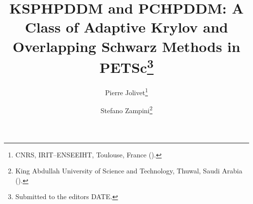 

\usepackage{lipsum}
\usepackage{amsfonts}
\usepackage{graphicx}
\usepackage{epstopdf}
\usepackage{algorithmic}
\ifpdf
\else
\fi

\newcommand{\creflastconjunction}{, and~}



\title{KSPHPDDM and PCHPDDM: A Class of Adaptive Krylov and Overlapping Schwarz Methods in PETS\MakeLowercase{c}\thanks{Submitted to the editors DATE.
}}

\author{Pierre Jolivet\thanks{CNRS, IRIT--ENSEEIHT, Toulouse, France 
  ().}
\and Stefano Zampini\thanks{King Abdullah University of Science and Technology, Thuwal, Saudi Arabia 
  ().}}

\usepackage{amsopn}
\DeclareMathOperator{\diag}{diag}


